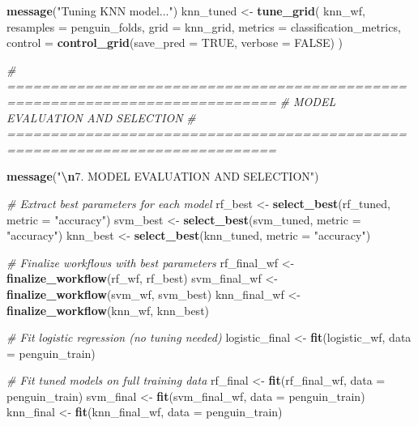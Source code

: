 \documentclass[
]{article}
\newenvironment{Shaded}{\begin{snugshade}}{\end{snugshade}}
\newcommand{\AttributeTok}[1]{\textcolor[rgb]{0.13,0.29,0.53}{#1}}
\newcommand{\CommentTok}[1]{\textcolor[rgb]{0.56,0.35,0.01}{\textit{#1}}}
\newcommand{\ConstantTok}[1]{\textcolor[rgb]{0.56,0.35,0.01}{#1}}
\newcommand{\FunctionTok}[1]{\textcolor[rgb]{0.13,0.29,0.53}{\textbf{#1}}}
\newcommand{\NormalTok}[1]{#1}
\newcommand{\OtherTok}[1]{\textcolor[rgb]{0.56,0.35,0.01}{#1}}
\newcommand{\SpecialCharTok}[1]{\textcolor[rgb]{0.81,0.36,0.00}{\textbf{#1}}}
\newcommand{\StringTok}[1]{\textcolor[rgb]{0.31,0.60,0.02}{#1}}
\begin{document}
\begin{Shaded}
\begin{Highlighting}[]
\FunctionTok{message}\NormalTok{(}\StringTok{"Tuning KNN model..."}\NormalTok{)}
\NormalTok{knn\_tuned }\OtherTok{\textless{}{-}} \FunctionTok{tune\_grid}\NormalTok{(}
\NormalTok{  knn\_wf,}
  \AttributeTok{resamples =}\NormalTok{ penguin\_folds,}
  \AttributeTok{grid =}\NormalTok{ knn\_grid,}
  \AttributeTok{metrics =}\NormalTok{ classification\_metrics,}
  \AttributeTok{control =} \FunctionTok{control\_grid}\NormalTok{(}\AttributeTok{save\_pred =} \ConstantTok{TRUE}\NormalTok{, }\AttributeTok{verbose =} \ConstantTok{FALSE}\NormalTok{)}
\NormalTok{)}

\CommentTok{\# =============================================================================}
\CommentTok{\# MODEL EVALUATION AND SELECTION}
\CommentTok{\# =============================================================================}

\FunctionTok{message}\NormalTok{(}\StringTok{"}\SpecialCharTok{\textbackslash{}n}\StringTok{7. MODEL EVALUATION AND SELECTION"}\NormalTok{)}

\CommentTok{\# Extract best parameters for each model}
\NormalTok{rf\_best }\OtherTok{\textless{}{-}} \FunctionTok{select\_best}\NormalTok{(rf\_tuned, }\AttributeTok{metric =} \StringTok{"accuracy"}\NormalTok{)}
\NormalTok{svm\_best }\OtherTok{\textless{}{-}} \FunctionTok{select\_best}\NormalTok{(svm\_tuned, }\AttributeTok{metric =} \StringTok{"accuracy"}\NormalTok{)}
\NormalTok{knn\_best }\OtherTok{\textless{}{-}} \FunctionTok{select\_best}\NormalTok{(knn\_tuned, }\AttributeTok{metric =} \StringTok{"accuracy"}\NormalTok{)}

\CommentTok{\# Finalize workflows with best parameters}
\NormalTok{rf\_final\_wf }\OtherTok{\textless{}{-}} \FunctionTok{finalize\_workflow}\NormalTok{(rf\_wf, rf\_best)}
\NormalTok{svm\_final\_wf }\OtherTok{\textless{}{-}} \FunctionTok{finalize\_workflow}\NormalTok{(svm\_wf, svm\_best)}
\NormalTok{knn\_final\_wf }\OtherTok{\textless{}{-}} \FunctionTok{finalize\_workflow}\NormalTok{(knn\_wf, knn\_best)}

\CommentTok{\# Fit logistic regression (no tuning needed)}
\NormalTok{logistic\_final }\OtherTok{\textless{}{-}} \FunctionTok{fit}\NormalTok{(logistic\_wf, }\AttributeTok{data =}\NormalTok{ penguin\_train)}

\CommentTok{\# Fit tuned models on full training data}
\NormalTok{rf\_final }\OtherTok{\textless{}{-}} \FunctionTok{fit}\NormalTok{(rf\_final\_wf, }\AttributeTok{data =}\NormalTok{ penguin\_train)}
\NormalTok{svm\_final }\OtherTok{\textless{}{-}} \FunctionTok{fit}\NormalTok{(svm\_final\_wf, }\AttributeTok{data =}\NormalTok{ penguin\_train)}
\NormalTok{knn\_final }\OtherTok{\textless{}{-}} \FunctionTok{fit}\NormalTok{(knn\_final\_wf, }\AttributeTok{data =}\NormalTok{ penguin\_train)}


\end{Highlighting}
\end{Shaded}
\end{document}
